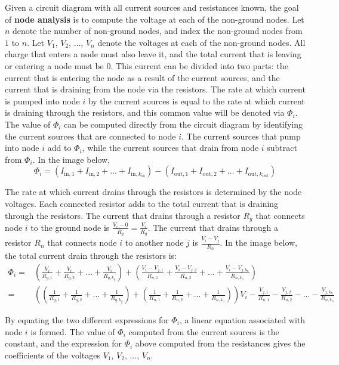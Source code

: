 \documentclass{article}
\begin{document}
Given a circuit diagram with all current sources and resistances known, the goal of {\bf node analysis} is to compute the voltage at each of the non-ground nodes. Let \(n\) denote the number of non-ground nodes, and index the non-ground nodes from \(1\) to \(n\). Let \(V_1\), \(V_2\), ..., \(V_n\) denote the voltages at each of the non-ground nodes. All charge that enters a node must also leave it, and the total current that is leaving or entering a node must be \(0\). This current can be divided into two parts: the current that is entering the node as a result of the current sources, and the current that is draining from the node via the resistors. The rate at which current is pumped into node \(i\) by the current sources is equal to the rate at which current is draining through the resistors, and this common value will be denoted via \(\Phi_i\). The value of \(\Phi_i\) can be computed directly from the circuit diagram by identifying the current sources that are connected to node \(i\). The current sources that pump into node \(i\) add to \(\Phi_i\), while the current sources that drain from node \(i\) subtract from \(\Phi_i\). In the image below,
\[\Phi_i = (I_{\text{in},1} + I_{\text{in},2} + ... + I_{\text{in},k_{\text{in}}}) - (I_{\text{out},1} + I_{\text{out},2} + ... + I_{\text{out},k_{\text{out}}})\]

The rate at which current drains through the resistors is determined by the node voltages. Each connected resistor adds to the total current that is draining through the resistors. The current that drains through a resistor \(R_g\) that connects node \(i\) to the ground node is \(\frac{V_i - 0}{R_g} = \frac{V_i}{R_g}\). The current that drains through a resistor \(R_n\) that connects node \(i\) to another node \(j\) is \(\frac{V_i - V_j}{R_n}\). In the image below, the total current drain through the resistors is:
\begin{align*}
\Phi_i = & \left(\frac{V_i}{R_{g,1}} + \frac{V_i}{R_{g,2}} + ... + \frac{V_i}{R_{g, k_g}}\right) + \left(\frac{V_i - V_{j,1}}{R_{n,1}} + \frac{V_i - V_{j,2}}{R_{n,2}} + ... + \frac{V_i - V_{j,k_n}}{R_{n, k_n}}\right) \\
= & \left((\frac{1}{R_{g,1}} + \frac{1}{R_{g,2}} + ... + \frac{1}{R_{g,k_g}}) + (\frac{1}{R_{n,1}} + \frac{1}{R_{n,2}} + ... + \frac{1}{R_{n,k_n}})\right)V_i - \frac{V_{j,1}}{R_{n,1}} - \frac{V_{j,2}}{R_{n,2}} - ... - \frac{V_{j,k_n}}{R_{n,k_n}}
\end{align*}

By equating the two different expressions for \(\Phi_i\), a linear equation associated with node \(i\) is formed. The value of \(\Phi_i\) computed from the current sources is the constant, and the expression for \(\Phi_i\) above computed from the resistances gives the coefficients of the voltages \(V_1\), \(V_2\), ..., \(V_n\). 
\end{document}
